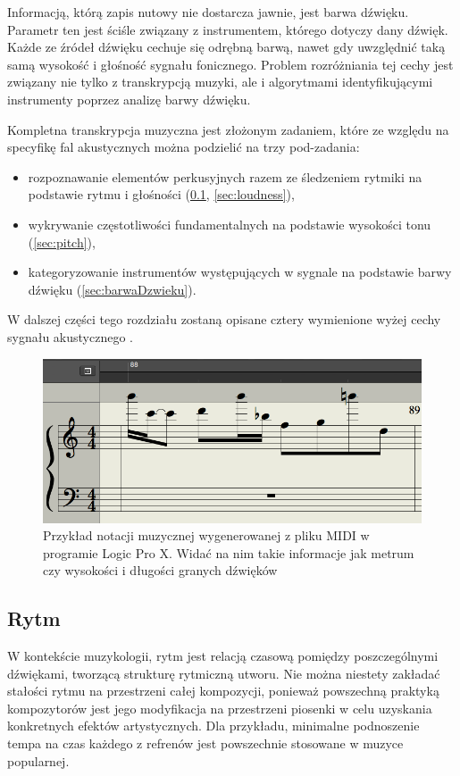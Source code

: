 \documentclass[12pt,a4paper,twoside]{mwart}
\begin{document}
Informacją, którą zapis nutowy nie dostarcza jawnie, jest barwa dźwięku. Parametr ten jest ściśle związany z instrumentem, którego dotyczy dany dźwięk. Każde ze źródeł dźwięku cechuje się odrębną barwą, nawet gdy uwzględnić taką samą wysokość i głośność sygnału fonicznego. Problem rozróżniania tej cechy jest związany nie tylko z transkrypcją muzyki, ale i algorytmami identyfikującymi instrumenty poprzez analizę barwy dźwięku.

Kompletna transkrypcja muzyczna jest złożonym zadaniem, które ze względu na specyfikę fal akustycznych można podzielić na trzy pod-zadania:
\begin{itemize}
  \item rozpoznawanie elementów perkusyjnych razem ze śledzeniem rytmiki na podstawie rytmu i głośności (\ref{sec:rytm}, \ref{sec:loudness}),
  \item wykrywanie częstotliwości fundamentalnych na podstawie wysokości tonu (\ref{sec:pitch}),
  \item  kategoryzowanie instrumentów występujących w sygnale na podstawie barwy dźwięku (\ref{sec:barwaDzwieku}).
\end{itemize}
W dalszej części tego rozdziału zostaną opisane cztery wymienione wyżej cechy sygnału akustycznego 
\cite[63]{Homerecording:DlaKazdego}
.
\begin{figure}[h]
  \begin{center}
    \includegraphics[scale=0.5]{images/pieciolinia_logic.png}
    \caption{Przykład notacji muzycznej wygenerowanej z pliku MIDI w programie Logic Pro X. Widać na nim takie informacje jak metrum czy wysokości i długości granych dźwięków}
  \end{center}
\end{figure}




\subsection{Rytm} \label{sec:rytm}
W kontekście muzykologii, rytm jest relacją czasową pomiędzy poszczególnymi dźwiękami, tworzącą strukturę rytmiczną utworu. Nie można niestety zakładać stałości rytmu na przestrzeni całej kompozycji, ponieważ powszechną praktyką kompozytorów jest jego modyfikacja na przestrzeni piosenki w celu uzyskania konkretnych efektów artystycznych. Dla przykładu, minimalne podnoszenie tempa na czas każdego z refrenów jest powszechnie stosowane w muzyce popularnej.
\end{document}
